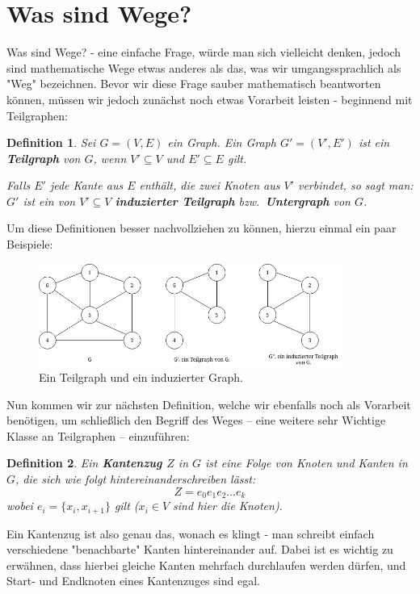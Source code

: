 \documentclass{article}
\newtheorem{definition}{Definition}
\theoremstyle{plain}
\begin{document}
\section{Was sind Wege?}
Was sind Wege? - eine einfache Frage, würde man sich vielleicht denken, jedoch sind mathematische Wege etwas anderes als das, was wir umgangssprachlich als "Weg" bezeichnen. Bevor wir diese Frage sauber mathematisch beantworten können, müssen wir jedoch zunächst noch etwas Vorarbeit leisten - beginnend mit Teilgraphen:\\
\begin{definition}
	Sei $G = (V, E)$ ein Graph. Ein Graph $G' = (V', E')$ ist ein \textbf{Teilgraph} von $G$, wenn $V' \subseteq V$ und $E' \subseteq E$ gilt.
		\par\bigskip
	Falls $E'$ jede Kante aus $E$ enthält, die zwei Knoten aus $V'$ verbindet, so sagt man: $G'$ ist ein von $V' \subseteq V$ \textbf{induzierter Teilgraph} bzw.\ \textbf{Untergraph} von $G$.
\end{definition}
Um diese Definitionen besser nachvollziehen zu können, hierzu einmal ein paar Beispiele:\\
\vfill
\begin{figure}[!htp]
    \centering
    \includegraphics[width=10cm]{vortrag_schriftlich/images/teilgraph.drawio.png}
    \caption{Ein Teilgraph und ein induzierter Graph.}
    \label{fig:fig6}
\end{figure}
\vfill
Nun kommen wir zur nächsten Definition, welche wir ebenfalls noch als Vorarbeit benötigen, um schließlich den Begriff des Weges -- eine weitere sehr Wichtige Klasse an Teilgraphen -- einzuführen:\\
\begin{definition}
	Ein \textbf{Kantenzug $Z$} in $G$ ist eine Folge von Knoten und Kanten in $G$, die sich wie folgt hintereinanderschreiben lässt:
	 \begin{equation*}
		Z = e_0e_1e_2 \ldots e_k
	\end{equation*}
	 wobei $e_i = \{x_i, x_{i+1}\}$ gilt ($x_i \in V$ sind hier die Knoten).
\end{definition}
\bigskip
Ein Kantenzug ist also genau das, wonach es klingt - man schreibt einfach verschiedene "benachbarte" Kanten hintereinander auf. Dabei ist es wichtig zu erwähnen, dass hierbei gleiche Kanten mehrfach durchlaufen werden dürfen, und Start- und Endknoten eines Kantenzuges sind egal.\\
\end{document}

